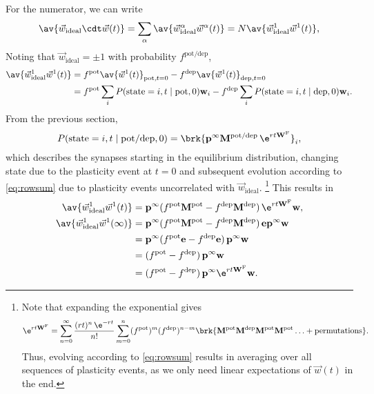 \documentclass{article} %
\newcommand{\wv}{\vec{w}}
\newcommand{\wvi}{\vec{w}_\text{ideal}}
\newcommand{\onev}{\mathbf{e}}
\newcommand{\pr}{\mathbf{p}}
\newcommand{\eq}{\pr^\infty}
\newcommand{\w}{\mathbf{w}}
\newcommand{\W}{\mathbf{W}}
\newcommand{\M}{\mathbf{M}}
\newcommand{\frg}{\W^{\mathrm{F}}}
\newcommand{\pot}{^{\text{pot}}}
\newcommand{\dep}{^{\text{dep}}}
\newcommand{\potdep}{^{\text{pot/dep}}}
\begin{document}
For the numerator, we can write
%
\begin{equation}\label{eq:overlapex}
  \av{\wv_\text{ideal}\cdt\wv(t)} = \sum_\alpha\av{\wv^\alpha_\text{ideal}\wv^\alpha(t)}
   = N \av{\wv^1_\text{ideal}\wv^1(t)},
\end{equation}
%
Noting that $\wvi=\pm1$ with probability $f\potdep$,
%
\begin{equation}\label{eq:overlapstate}
\begin{aligned}
  \av{\wv^1_\text{ideal}\wv^1(t)} &= f\pot \av{\wv^1(t)}_{\text{pot},t=0} - f\dep \av{\wv^1(t)}_{\text{dep},t=0} \\
   &= f\pot \sum_i P(\text{state}=i,t \mid \text{pot},0) \w_i - f\dep \sum_i P(\text{state}=i,t \mid \text{dep},0) \w_i.
\end{aligned}
\end{equation}
%
From the previous section,
%
\begin{equation}\label{eq:stateprob}
  P(\text{state}=i,t \mid \text{pot/dep},0) = \brk{ \eq \M\potdep\, \e^{rt\frg} }_i,
\end{equation}
%
which describes the synapses starting in the equilibrium distribution, changing state due to the plasticity event at $t=0$ and subsequent evolution according to \eqref{eq:rowsum} due to plasticity events uncorrelated with $\wvi$.%
\footnote{Note that expanding the exponential gives
%
\begin{equation*}
  \e^{rt\frg} =  \sum_{n=0}^\infty \frac{(rt)^n\,\e^{-rt}}{n!} \sum_{m=0}^n (f\pot)^m (f\dep)^{n-m}
  \brk{ \M\pot \M\dep \M\pot \M\pot \ldots + \text{permutations}}.
\end{equation*}
%
Thus, evolving according to \eqref{eq:rowsum} results in averaging over all sequences of plasticity events,
as we only need linear expectations of $\wv(t)$ in the end.}
This results in
%
\begin{equation}\label{eq:overlapwt}
\begin{aligned}
  \av{\wv^1_\text{ideal}\wv^1(t)} &= \eq (f\pot\M\pot-f\dep\M\dep)\, \e^{rt\frg} \w, \\
  \av{\wv^1_\text{ideal}\wv^1(\infty)} &= \eq (f\pot\M\pot-f\dep\M\dep)\, \onev\eq \w \\
         &= \eq (f\pot\onev-f\dep\onev)\, \eq \w \\
         &=  (f\pot-f\dep)\, \eq \w \\
         &=  (f\pot-f\dep)\, \eq \e^{rt\frg} \w .
\end{aligned}
\end{equation}
%
\end{document}
